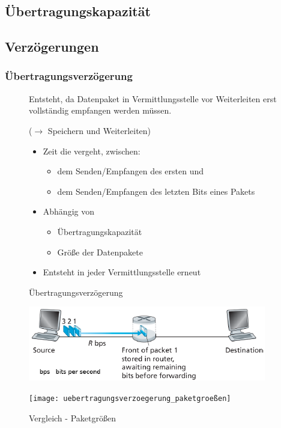 \documentclass[12pt]{report}
\begin{document}
\subsection{Übertragungskapazität}
\subsection{Verzögerungen}

\subsubsection{Übertragungsverzögerung}
\begin{figure}[H]
  \begin{minipage}[t]{0.45\textwidth}
    Entsteht, da Datenpaket in Vermittlungsstelle vor Weiterleiten
    erst vollständig empfangen werden müssen. 
    
    ($\rightarrow$ Speichern und Weiterleiten)
    \begin{itemize}

      \item Zeit die vergeht, zwischen:
            \begin{itemize}
              \item dem Senden/Empfangen des ersten und
              \item dem Senden/Empfangen des letzten Bits eines Pakets
            \end{itemize}
      \item Abhängig von
            \begin{itemize}
              \item Übertragungskapazität
              \item Größe der Datenpakete
            \end{itemize}
      \item Entsteht in jeder Vermittlungsstelle erneut
    \end{itemize}
  \end{minipage}
  \hfill
  \begin{minipage}[t]{0.45\textwidth}
    \caption{Übertragungsverzögerung}
    \begin{center}
      \includegraphics[width=\textwidth]{uebertragungsverzoegerung}
    \end{center}
    
    \caption{Vergleich - Paketgrößen}
    \begin{center}
      \texttt{[image: uebertragungsverzoegerung\_paketgroeßen]}
    \end{center}
  \end{minipage}
\end{figure}
\end{document}
